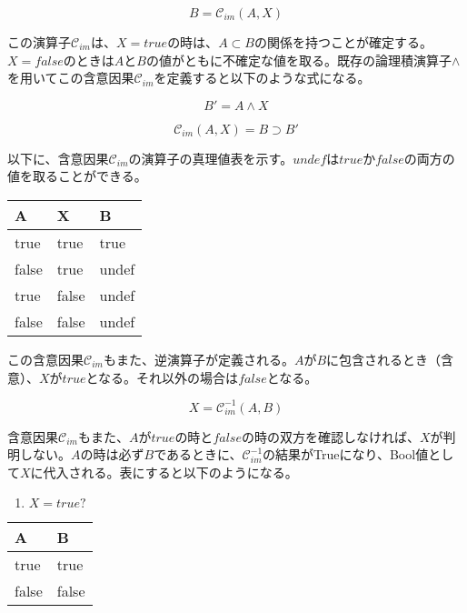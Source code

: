 \documentclass[12pt]{article}
\begin{document}
\begin{equation}B=\mathcal{C}_{im}(A , X)\end{equation}

この演算子\(\mathcal{C}_{im}\)は、\(X=true\)の時は、\(A \subset B\)の関係を持つことが確定する。\(X=false\)のときは\(A\)と\(B\)の値がともに不確定な値を取る。既存の論理積演算子\(\wedge\)を用いてこの含意因果\(\mathcal{C}_{im}\)を定義すると以下のような式になる。

\begin{equation} B' = A \wedge X\end{equation}

\begin{equation} \mathcal{C}_{im}(A,X) = B \supset B' \end{equation}

以下に、含意因果\(\mathcal{C}_{im}\)の演算子の真理値表を示す。\(undef\)は\(true\)か\(false\)の両方の値を取ることができる。

\begin{longtable}[]{@{}lll@{}}
\toprule\noalign{}
A & X & B \\
\midrule\noalign{}
\endhead
\bottomrule\noalign{}
\endlastfoot
true & true & true \\
false & true & undef \\
true & false & undef \\
false & false & undef \\
\end{longtable}

この含意因果\(\mathcal{C}_{im}\)もまた、逆演算子が定義される。\(A\)が\(B\)に包含されるとき（含意）、\(X\)が\(true\)となる。それ以外の場合は\(false\)となる。

\begin{equation} X=\mathcal{C}_{im}^{-1}(A,B)\end{equation}

含意因果\(\mathcal{C}_{im}\)もまた、\(A\)が\(true\)の時と\(false\)の時の双方を確認しなければ、\(X\)が判明しない。\(A\)の時は必ず\(B\)であるときに、\(\mathcal{C}_{im}^{-1}\)の結果がTrueになり、Bool値として\(X\)に代入される。表にすると以下のようになる。

\begin{enumerate}
\def\labelenumi{\arabic{enumi}.}

\item
  \(X=true?\)
\end{enumerate}

\begin{longtable}[]{@{}ll@{}}
\toprule\noalign{}
A & B \\
\midrule\noalign{}
\endhead
\bottomrule\noalign{}
\endlastfoot
true & true \\
false & false \\
\end{longtable}
\end{document}
